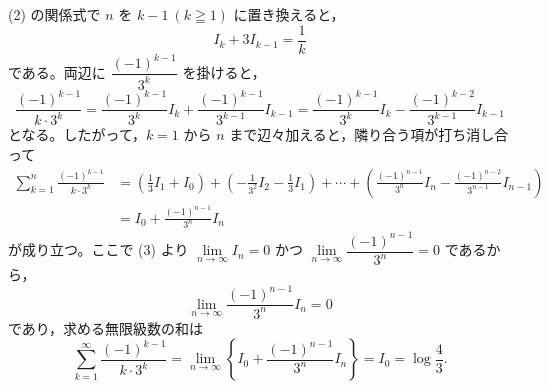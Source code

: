 
(2) の関係式で $n$ を $k-1\ (k\geqq 1)$ に置き換えると，
\[
  I_{k} + 3I_{k-1} = \frac{1}{k}
\]
である。両辺に $\dfrac{(-1)^{k-1}}{3^{k}}$ を掛けると，
\[
  \frac{(-1)^{k-1}}{k\cdot 3^{k}}
  = \frac{(-1)^{k-1}}{3^{k}}I_{k} + \frac{(-1)^{k-1}}{3^{k-1}}I_{k-1}
  = \frac{(-1)^{k-1}}{3^{k}}I_{k} - \frac{(-1)^{k-2}}{3^{k-1}}I_{k-1}
\]
となる。したがって，$k=1$ から $n$ まで辺々加えると，隣り合う項が打ち消し合って
\begin{align*}
  \sum_{k=1}^{n}\frac{(-1)^{k-1}}{k\cdot 3^{k}}
  &= \left(\frac{1}{3}I_{1} + I_{0}\right) + \left(-\frac{1}{3^{2}}I_{2} - \frac{1}{3}I_{1}\right) + \cdots + \left(\frac{(-1)^{n-1}}{3^{n}}I_{n} - \frac{(-1)^{n-2}}{3^{n-1}}I_{n-1}\right) \\
  &= I_{0} + \frac{(-1)^{n-1}}{3^{n}}I_{n}
\end{align*}
が成り立つ。ここで (3) より $\lim\limits_{n\to\infty}I_{n}=0$ かつ $\lim\limits_{n\to\infty}\dfrac{(-1)^{n-1}}{3^{n}}=0$ であるから，
\[
  \lim_{n\to\infty}\frac{(-1)^{n-1}}{3^{n}}I_{n} = 0
\]
であり，求める無限級数の和は
\[
  \sum_{k=1}^{\infty}\frac{(-1)^{k-1}}{k\cdot 3^{k}}
  = \lim_{n\to\infty}\left\{I_{0}+\frac{(-1)^{n-1}}{3^{n}}I_{n}\right\} = I_{0} = \log\frac{4}{3}.
\]


